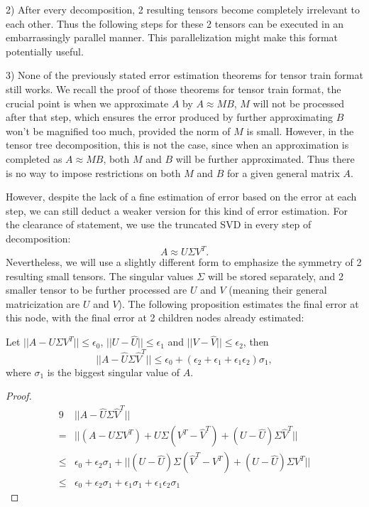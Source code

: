 \documentclass[12pt]{article}
\begin{document}
2) After every decomposition, 2 resulting tensors become completely irrelevant to each other. Thus the following steps for these 2 tensors can be executed in an embarrassingly parallel manner. This parallelization might make this format potentially useful. 

3) None of the previously stated error estimation theorems for tensor train format still works. We recall the proof of those theorems for tensor train format, the crucial point is when we approximate $A$ by $A \approx MB$, $M$ will not be processed after that step, which ensures the error produced by further approximating $B$ won't be magnified too much, provided the norm of $M$ is small. However, in the tensor tree decomposition, this is not the case, since when an approximation is completed as $A \approx MB$, both $M$ and $B$ will be further approximated. Thus there is no way to impose restrictions on both $M$ and $B$ for a given general matrix $A$.

However, despite the lack of a fine estimation of error based on the error at each step, we can still deduct a weaker version for this kind of error estimation. For the clearance of statement, we use the truncated SVD in every step of decomposition:
$$ A \approx U \Sigma V^T.$$
Nevertheless, we will use a slightly different form to emphasize the symmetry of 2 resulting small tensors. The singular values $\Sigma$ will be stored separately, and 2 smaller tensor to be further processed are $U$ and $V$ (meaning their general matricization are $U$ and $V$). The following proposition estimates the final error at this node, with the final error at 2 children nodes already estimated:

\begin{myprop}
Let $|| A - U \Sigma V^T|| \leq \epsilon_0$, $|| U - \hat{U} || \leq \epsilon_1$ and $|| V - \hat{V} || \leq \epsilon_2$, then
$$ || A - \hat{U} \Sigma \hat{V}^T || \leq \epsilon_0 + (\epsilon_2 + \epsilon_1 + \epsilon_1 \epsilon_2) \sigma_1,$$
where $\sigma_1$ is the biggest singular value of $A$.
\end{myprop}

\begin{proof}
\begin{alignat*}{9}
& || A - \hat{U} \Sigma \hat{V}^T ||  \\
= & || (A - U \Sigma V^T) + U \Sigma (V^T - \hat{V}^T) + (U - \hat{U}) \Sigma \hat{V}^T ||  \\
\leq & \epsilon_0 + \epsilon_2 \sigma_1 + ||(U - \hat{U}) \Sigma (\hat{V}^T - V^T) + (U - \hat{U}) \Sigma V^T|| \\
\leq &  \epsilon_0 + \epsilon_2 \sigma_1 + \epsilon_1 \sigma_1 + \epsilon_1 \epsilon_2 \sigma_1
\end{alignat*}
\end{proof}
\end{document}
